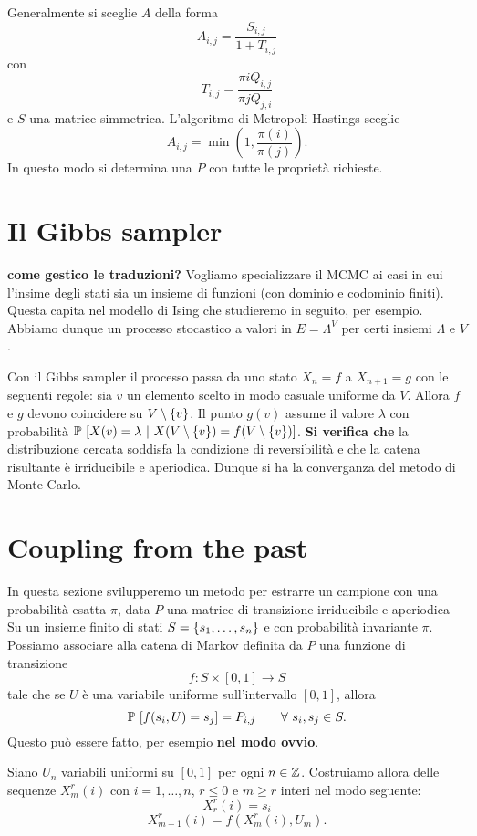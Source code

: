 \documentclass[]{marticle}
\begin{document}
Generalmente si sceglie $A$ della forma
\[
    A_{i,j} = \frac{S_{i,j}}{1+T_{i,j}}
\]
con
\[
    T_{i, j} = \frac{\pi{i} Q_{i,j}}{\pi{j} Q_{j,i}}
\]
e $S$ una matrice simmetrica.
L'algoritmo di Metropoli-Hastings sceglie
\[
    A_{i,j} = \min (1, \frac{\pi(i)}{\pi(j)}).
\]
 In questo modo si determina una $P$ con tutte le propriet\`a richieste.

\section{Il Gibbs sampler}

\textbf{come gestico le traduzioni?}
Vogliamo specializzare il MCMC ai casi in cui l'insime degli stati sia un
insieme di funzioni (con dominio e codominio finiti). Questa capita nel modello
di Ising che studieremo in seguito, per esempio. Abbiamo dunque un processo
stocastico a valori in $E=\Lambda^V$ per certi insiemi $\Lambda$ e $V$. 

Con il Gibbs sampler il processo passa da uno stato $X_n=f$ a $X_{n+1}=g$ con le
seguenti regole: sia $v$ un elemento scelto in modo casuale uniforme da $V$.
Allora $f$ e $g$ devono coincidere su $V\setminus\{v\}$. Il punto $g(v)$
assume il valore $\lambda$ con probabilit\`a $\prob{X(v)=\lambda \ |\ 
X(V\setminus\setof{v})=f(V\setminus\setof{v})}$. \textbf{Si verifica che} la
distribuzione cercata soddisfa la condizione di reversibilit\`a e che la catena
risultante \`e irriducibile e aperiodica. Dunque si ha la converganza del metodo
di Monte Carlo.


\section{Coupling from the past}

In questa sezione svilupperemo un metodo per estrarre un campione con una
probabilit\`a esatta $\pi$, data $P$ una matrice di transizione irriducibile e
aperiodica Su un insieme finito di stati $S=\{s_1,\dots,s_n\}$ e con
probabilit\`a invariante $\pi$. Possiamo associare alla catena di Markov
definita da $P$ una funzione di transizione 
\[
    f\colon S\times [0,1] \longrightarrow S
\]
tale che se $U$ \`e una variabile uniforme sull'intervallo $[0,1]$, allora 
\[
    \prob{f(s_i,U)=s_j}=P_{i,j} \qquad \forall s_i,s_j \in S.
\]
Questo pu\`o essere fatto, per esempio \textbf{nel modo ovvio}.

Siano $U_n$ variabili uniformi su $[0,1]$ per ogni $n\in \mathbb{Z}$. Costruiamo allora
delle sequenze $X^r_m(i)$ con $i = 1,\dots,n$, $r\leq 0$ e $m \geq r$ interi nel
modo seguente:
\[
    X^r_r(i) = s_i
\]
\[
    X^r_{m+1}(i) = f(X^r_m(i), U_m).
\]
\end{document}
